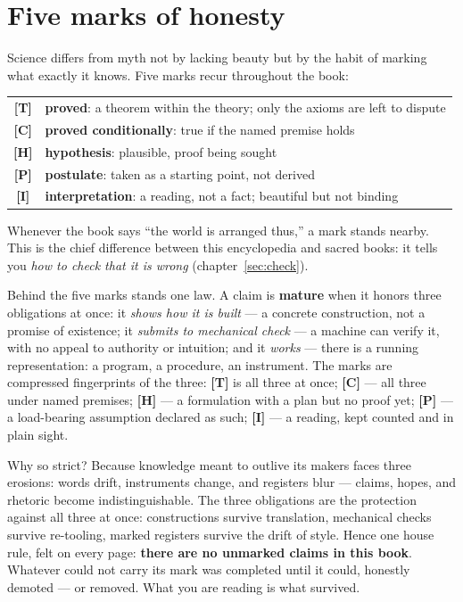 \documentclass[11pt,letterpaper]{article}
\newcommand{\stT}{\textbf{[T]}\xspace}
\newcommand{\stC}{\textbf{[C]}\xspace}
\newcommand{\stP}{\textbf{[P]}\xspace}
\newcommand{\stI}{\textbf{[I]}\xspace}
\newcommand{\stH}{\textbf{[H]}\xspace}
\begin{document}
\tableofcontents
\newpage

\section*{Five marks of honesty}

Science differs from myth not by lacking beauty but by the habit of
marking what exactly it knows. Five marks recur throughout the book:

\begin{center}
\begin{tabular}{@{}cl@{}}
\toprule
\stT & \textbf{proved}: a theorem within the theory; only the axioms are left to dispute \\
\stC & \textbf{proved conditionally}: true if the named premise holds \\
\stH & \textbf{hypothesis}: plausible, proof being sought \\
\stP & \textbf{postulate}: taken as a starting point, not derived \\
\stI & \textbf{interpretation}: a reading, not a fact; beautiful but not binding \\
\bottomrule
\end{tabular}
\end{center}

Whenever the book says ``the world is arranged thus,'' a mark stands
nearby. This is the chief difference between this encyclopedia and
sacred books: it tells you \emph{how to check that it is wrong}
(chapter~\ref{sec:check}).

Behind the five marks stands one law. A claim is \textbf{mature}
when it honors three obligations at once: it \emph{shows how it is
built} --- a concrete construction, not a promise of existence; it
\emph{submits to mechanical check} --- a machine can verify it,
with no appeal to authority or intuition; and it \emph{works} ---
there is a running representation: a program, a procedure, an
instrument. The marks are compressed fingerprints of the three:
\stT{} is all three at once; \stC{} --- all three under named
premises; \stH{} --- a formulation with a plan but no proof yet;
\stP{} --- a load-bearing assumption declared as such; \stI{} --- a
reading, kept counted and in plain sight.

Why so strict? Because knowledge meant to outlive its makers faces
three erosions: words drift, instruments change, and registers blur
--- claims, hopes, and rhetoric become indistinguishable. The three
obligations are the protection against all three at once:
constructions survive translation, mechanical checks survive
re-tooling, marked registers survive the drift of style. Hence one
house rule, felt on every page: \textbf{there are no unmarked
claims in this book}. Whatever could not carry its mark was
completed until it could, honestly demoted --- or removed. What you
are reading is what survived.
\end{document}
